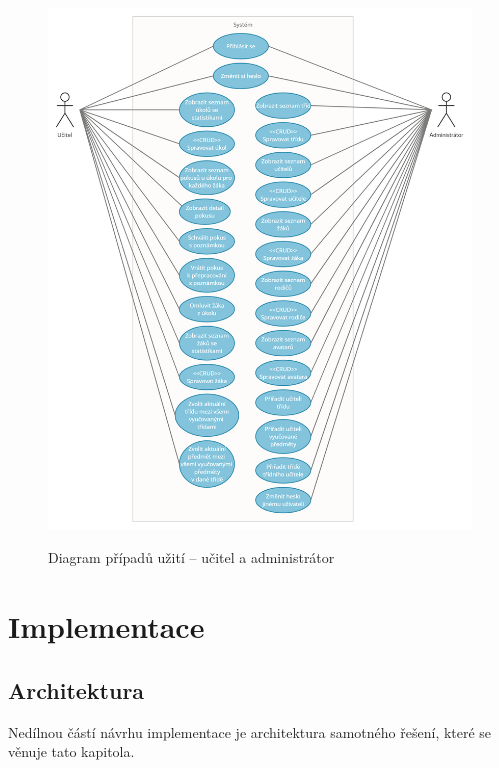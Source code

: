 \documentclass[twoside]{ctuthesis}
\theoremstyle{plain}
\theoremstyle{definition}
\theoremstyle{note}
\begin{document}
\begin{figure}
    \caption{Diagram případů užití -- učitel a administrátor}
    \centering
    \includegraphics[width=\textwidth]{images/ucitel_a_admin}
    \label{img:usecase_ucitel_a_admin}
\end{figure}














\part{Implementace}
\label{part:implementace}





\chapter{Architektura}
\label{chap:architektura}
Nedílnou částí návrhu implementace je architektura samotného řešení, které se věnuje tato kapitola.
\end{document}
